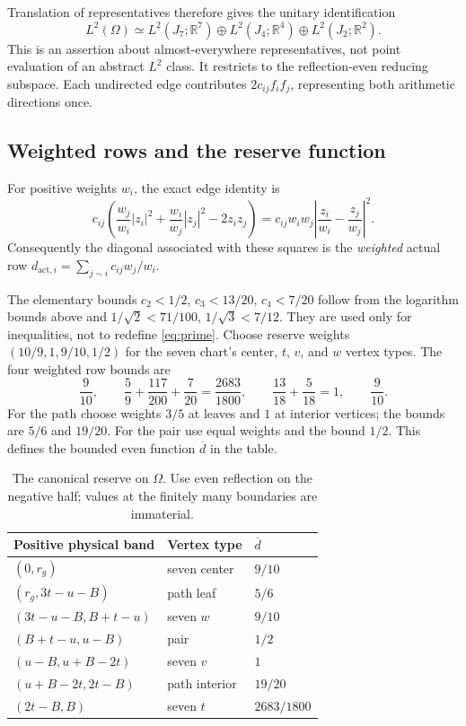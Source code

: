 \documentclass[11pt,a4paper]{article}
\newcommand{\R}{\mathbb R}
\newcommand{\dbar}{\overline d}
\theoremstyle{remark}
\numberwithin{equation}{section}
\begin{document}
Translation of representatives therefore gives the unitary identification
\[
 L^2(\Omega)\simeq L^2(J_7;\R^7)\oplus
 L^2(J_4;\R^4)\oplus L^2(J_2;\R^2).
\]
This is an assertion about almost-everywhere representatives, not point
evaluation of an abstract $L^2$ class. It restricts to the reflection-even
reducing subspace. Each undirected edge contributes
$2c_{ij}f_i f_j$, representing both arithmetic directions once.

\subsection{Weighted rows and the reserve function}
For positive weights $w_i$, the exact edge identity is
\begin{equation}\label{eq:edge-square}
 c_{ij}\left(\frac{w_j}{w_i}|z_i|^2+
              \frac{w_i}{w_j}|z_j|^2-2z_i z_j\right)
 =c_{ij}w_iw_j\left|\frac{z_i}{w_i}-\frac{z_j}{w_j}\right|^2.
\end{equation}
Consequently the diagonal associated with these squares is the
\emph{weighted} actual row
$d_{\mathrm{act},i}=\sum_{j\sim i}c_{ij}w_j/w_i$.

The elementary bounds $c_2<1/2$, $c_3<13/20$, $c_4<7/20$ follow from
the logarithm bounds above and $1/\sqrt2<71/100$, $1/\sqrt3<7/12$.
They are used only for inequalities, not to redefine \eqref{eq:prime}.
Choose reserve weights $(10/9,1,9/10,1/2)$ for the seven chart's
center, $t$, $v$, and $w$ vertex types. The four weighted row bounds are
\[
 \frac9{10},\qquad
 \frac59+\frac{117}{200}+\frac7{20}=\frac{2683}{1800},\qquad
 \frac{13}{18}+\frac5{18}=1,\qquad\frac9{10}.
\]
For the path choose weights $3/5$ at leaves and $1$ at interior vertices;
the bounds are $5/6$ and $19/20$. For the pair use equal weights and the
bound $1/2$. This defines the bounded even function $\dbar$ in the table.

\begin{table}[htbp]
\centering\small
\begin{tabular}{lll}
\toprule
Positive physical band&Vertex type&$\dbar$\\
\midrule
$(0,r_g)$&seven center&$9/10$\\
$(r_g,3t-u-B)$&path leaf&$5/6$\\
$(3t-u-B,B+t-u)$&seven $w$&$9/10$\\
$(B+t-u,u-B)$&pair&$1/2$\\
$(u-B,u+B-2t)$&seven $v$&$1$\\
$(u+B-2t,2t-B)$&path interior&$19/20$\\
$(2t-B,B)$&seven $t$&$2683/1800$\\
\bottomrule
\end{tabular}
\caption{The canonical reserve on $\Omega$. Use even reflection on the
negative half; values at the finitely many boundaries are immaterial.}
\label{tab:reserve}
\end{table}
\end{document}
